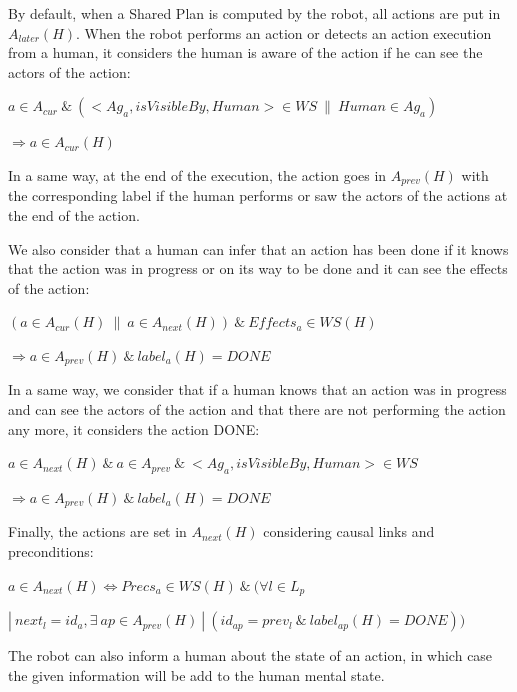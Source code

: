 \documentclass[english,a4paper,11pt,twoside]{StyleThese}
\begin{document}
By default, when a Shared Plan is computed by the robot, all actions are put in $A_{later}(H)$. When the robot performs an action or detects an action execution from a human, it considers the human is aware of the action if he can see the actors of the action:

\begin{center}
$a \in A_{cur} \ \& \ (<Ag_a, isVisibleBy, Human> \in WS \ \| \ Human \in Ag_a)$ 

$\Rightarrow a \in A_{cur}(H)$
\end{center}

In a same way, at the end of the execution, the action goes in $A_{prev}(H)$ with the corresponding label if the human performs or saw the actors of the actions at the end of the action.

We also consider that a human can infer that an action has been done if it knows that the action was in progress or on its way to be done and it can see the effects of the action:

\begin{center}
$(a \in A_{cur}(H) \ \| \ a \in A_{next}(H)) \ \& \ Effects_{a} \in WS(H)$ 

$\Rightarrow a \in A_{prev}(H) \ \& \ label_a(H) = DONE$
\end{center}

In a same way, we consider that if a human knows that an action was in progress and can see the actors of the action and that there are not performing the action any more, it considers the action DONE:

\begin{center}
$a \in A_{next}(H) \ \& \ a \in A_{prev} \ \& \ <Ag_a, isVisibleBy, Human> \in WS$

$\Rightarrow a \in A_{prev}(H) \ \& \ label_a(H) = DONE$
\end{center}

Finally, the actions are set in $A_{next}(H)$ considering causal links and preconditions:

\begin{center}
$a \in A_{next}(H) \Leftrightarrow Precs_{a} \in WS(H) \ \& \ (\forall l \in L_p$ 

$| \ next_l = id_a, \exists \ ap \in A_{prev}(H) \ | \ (id_{ap} = prev_l \ \& \ label_{ap}(H)  = DONE))$
\end{center}

The robot can also inform a human about the state of an action, in which case the given information will be add to the human mental state.
\end{document}
